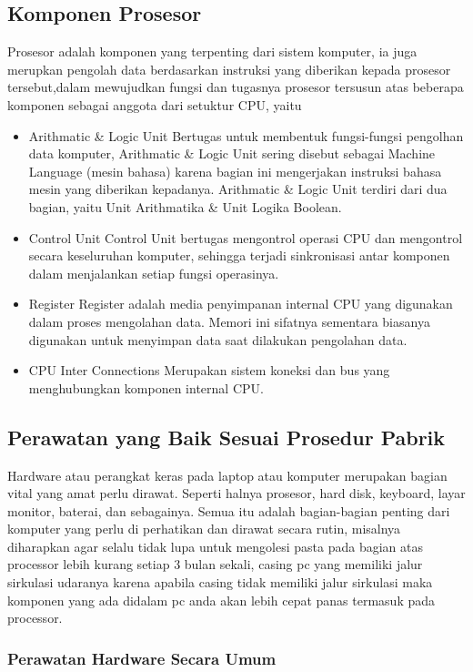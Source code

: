 \subsection{Komponen Prosesor}
Prosesor adalah komponen yang terpenting dari sistem komputer, ia juga merupkan pengolah data berdasarkan instruksi yang diberikan kepada
prosesor tersebut,dalam mewujudkan fungsi dan tugasnya prosesor tersusun atas beberapa komponen sebagai anggota dari setuktur CPU, yaitu

\begin{itemize}
	\item{Arithmatic & Logic Unit}
	Bertugas untuk membentuk fungsi-fungsi pengolhan data komputer, Arithmatic & Logic Unit sering disebut sebagai Machine Language
	(mesin bahasa) karena bagian ini mengerjakan instruksi bahasa mesin yang diberikan kepadanya. Arithmatic & Logic Unit terdiri
	dari dua bagian, yaitu Unit Arithmatika & Unit Logika Boolean.
	\item{Control Unit}
	Control Unit bertugas mengontrol operasi CPU dan mengontrol secara keseluruhan komputer, sehingga terjadi sinkronisasi antar komponen
	dalam menjalankan setiap fungsi operasinya.
	\item{Register}
	Register adalah media penyimpanan internal CPU yang digunakan dalam proses mengolahan data. Memori ini sifatnya sementara biasanya
	digunakan untuk menyimpan data saat dilakukan pengolahan data.
	\item{CPU Inter Connections}
	Merupakan sistem koneksi dan bus yang menghubungkan komponen internal CPU.
\end{itemize}

\subsection{Perawatan yang Baik Sesuai Prosedur Pabrik}
Hardware atau perangkat keras pada laptop atau komputer merupakan bagian vital yang amat perlu dirawat. 
Seperti halnya prosesor, hard disk, keyboard, layar monitor, baterai, dan sebagainya. 
Semua itu adalah bagian-bagian penting dari komputer yang perlu di perhatikan dan dirawat secara rutin, misalnya
diharapkan agar selalu tidak lupa untuk mengolesi pasta pada bagian atas processor lebih kurang setiap 3 bulan sekali,
casing pc yang memiliki jalur sirkulasi udaranya karena apabila casing tidak memiliki jalur sirkulasi maka komponen yang 
ada didalam pc anda akan lebih cepat panas termasuk pada processor. 


\subsubsection{Perawatan Hardware Secara Umum}

